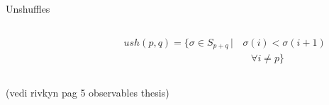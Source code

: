 \documentclass{beamer}              %
\begin{document}
\begin{frame}[fragile]{Unshuffles} 
  	\begin{defblock}[Unshuffles]
		\begin{columns}
	    \begin{column}{.4\linewidth}
	    \end{column}  
	    \begin{column}{.6\linewidth}
	    	\begin{displaymath}
	    	\begin{split}
				ush(p,q) = \big\lbrace	\sigma \in S_{p+q} \,\big\vert & \, \sigma(i) < \sigma(i+1) \\ 
				& \quad \forall i \neq p \big\rbrace	    		
			\end{split}	    	
	    	\end{displaymath}
	    \end{column}  
		\end{columns}
  	\end{defblock}
  	(vedi rivkyn pag 5 observables thesis)
  \end{frame}
\end{document}
